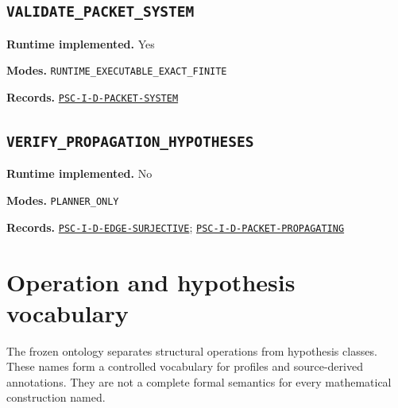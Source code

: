 \documentclass[a4paper,11pt]{article}
\newcommand{\field}[2]{\noindent\textbf{#1.} #2\par}
\begin{document}
\subsection*{\nolinkurl{VALIDATE_PACKET_SYSTEM}}
\field{Runtime implemented}{Yes}
\field{Modes}{\nolinkurl{RUNTIME_EXECUTABLE_EXACT_FINITE}}
\field{Records}{\hyperref[rec:PSC-I-D-PACKET-SYSTEM]{\nolinkurl{PSC-I-D-PACKET-SYSTEM}}}
\subsection*{\nolinkurl{VERIFY_PROPAGATION_HYPOTHESES}}
\field{Runtime implemented}{No}
\field{Modes}{\nolinkurl{PLANNER_ONLY}}
\field{Records}{\hyperref[rec:PSC-I-D-EDGE-SURJECTIVE]{\nolinkurl{PSC-I-D-EDGE-SURJECTIVE}}; \hyperref[rec:PSC-I-D-PACKET-PROPAGATING]{\nolinkurl{PSC-I-D-PACKET-PROPAGATING}}}
\clearpage\section{Operation and hypothesis vocabulary}
The frozen ontology separates structural operations from hypothesis classes. These names form a controlled vocabulary for profiles and source-derived annotations. They are not a complete formal semantics for every mathematical construction named.
\end{document}

